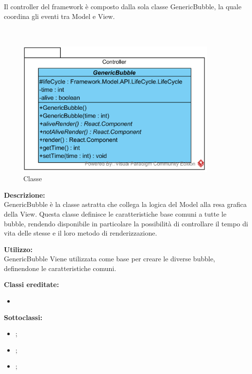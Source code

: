 \subsubsection[::Controller]{\class}\label{\class}
Il controller del framework è composto dalla sola classe GenericBubble, la quale coordina gli eventi tra Model e View.

\paragraph[::GenericBubble]{\class}\mbox{}\\ \label{\class}
\begin{figure}[H]
	\centering
	\includegraphics[width=10cm]{./diagrammi/framework/controller/genericbubble.png}
	\caption{Classe \class}
\end{figure}
\textbf{Descrizione:}\\
GenericBubble è la classe astratta che collega la logica del Model alla resa grafica della View. Questa classe definisce le caratteristiche base comuni a tutte le bubble, rendendo disponibile in particolare la possibilità di controllare il tempo di vita delle stesse e il loro metodo di renderizzazione.

\textbf{Utilizzo:}\\
GenericBubble Viene utilizzata come base per creare le diverse bubble, definendone le caratteristiche comuni.

\textbf{Classi ereditate:}
\begin{itemize}
	\item {}
\end{itemize}

\textbf{Sottoclassi:}
\begin{itemize}
	\item {};
	\item {};
	\item {};
\end{itemize}

